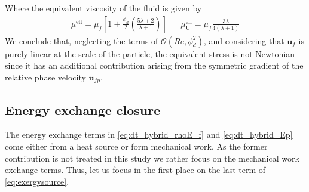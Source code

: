 Where the equivalent viscosity of the fluid is given by 
\begin{align*}
    \mu^\text{eff} = \mu_f \left[
        1
        +\frac{\phi_d}{2}\left(
            \frac{5\lambda +2}{\lambda +1}
        \right)
    \right] &&
    \mu^\text{eff}_\text{U}
    = \mu_f\frac{ 3\lambda}{4(\lambda +1) }
\end{align*}
We conclude that, neglecting the terms of $\mathcal{O}(Re,\phi^2_d)$, and considering that $\textbf{u}_f$ is purely linear at the scale of the particle, the equivalent stress is not Newtonian since it has an additional contribution arising from the symmetric gradient of the relative phase velocity $\textbf{u}_{fp}$. 


\subsection{Energy exchange closure}

The energy exchange terms in \ref{eq:dt_hybrid_rhoE_f} and \ref{eq:dt_hybrid_Ep} come either from a heat source or form mechanical work. 
As the former contribution is not treated in this study we rather focus on the mechanical work exchange terms. 
Thus, let us focus in the first place on the last term of \ref{eq:exergysource}.

